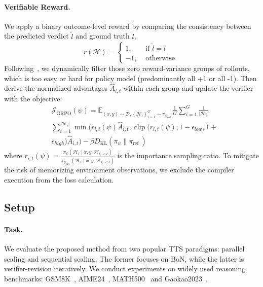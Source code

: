 \documentclass[11pt]{article}
\begin{document}
\paragraph{Verifiable Reward.}
We apply a binary outcome-level reward by comparing the consistency between the predicted verdict $\tilde{l}$ and ground truth $l$,
\begin{equation}
r(\mathcal{H})= \begin{cases}1, & \text { if  } \tilde{l}=  l 
 \\ -1, & \text { otherwise } \end{cases}
\end{equation}
Following~\citet{Yu:2025:DAPO}, we dynamically filter those zero reward-variance groups of rollouts, which is too easy or hard for policy model (predominantly all +1 or all -1). Then derive the normalized advantages $\hat{A}_{i, t}$ within each group and update the verifier with the objective:
\begin{align}
& \mathcal{J}_{\mathrm{GRPO}}(\psi)=\mathbb{E}_{(x,y ) \sim \mathcal{D},\left\{\mathcal{H}_i\right\}_{i=1}^G \sim \pi_{\psi_{\text {old }}}} 
\frac{1}{G}  \sum_{i=1}^G \frac{1}{\left|\mathcal{H}_i \right|} \nonumber  \\
& \sum_{t=1}^{\left| \mathcal{H}_i \right|}  
\min( r_{i, t}(\psi) \hat{A}_{i, t}, \operatorname{clip} (r_{i, t}(\psi), 1-\epsilon_{low}, 1+  \nonumber  \\
& \epsilon_{high}) \hat{A}_{i, t} ) - \beta D_{\mathrm{KL}}\left(\pi_\psi \| \pi_{\text {ref }}\right) 
\end{align}
where $r_{i, t}(\psi)=\frac{\pi_\psi\left(\mathcal{H}_{i} \mid x, y, \mathcal{H}_{i,<t} \right)}{\pi_{\psi_{\text {old }}}\left(\mathcal{H}_{i} \mid x, y, \mathcal{H}_{i,<t}\right)}$ is the importance sampling ratio.
To mitigate the risk of memorizing environment observations, we exclude the compiler execution from the loss calculation. 

\subsection{Setup}
\paragraph{Task.}
We evaluate the proposed method from two popular TTS paradigms: parallel scaling and sequential scaling. The former focuses on BoN, while the latter is verifier-revision iteratively. 
We conduct experiments on widely used reasoning benchmarks: GSM8K~\citep{Cobbe:2023:GSM8k}, AIME24~\citep{AIME:2024:AIME}, MATH500~\citep{Lightman:2024:MATH500} and Gaokao2023~\citep{Liao:2024:Gaokao2023}.
\end{document}
